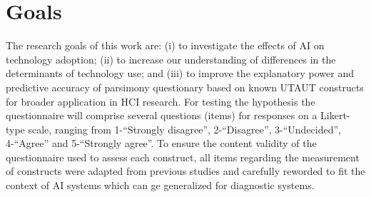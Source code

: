 
\section{Goals}
\label{sec:sec009}

The research goals of this work are: (i) to investigate the effects of AI on technology adoption; (ii) to increase our understanding of differences in the determinants of technology use; and (iii) to improve the explanatory power and predictive accuracy of parsimony questionary based on known UTAUT constructs for broader application in HCI research.
For testing the hypothesis the questionnaire will comprise several questions (items) for responses on a Likert-type scale, ranging from 1-``Strongly disagree'', 2-``Disagree'', 3-``Undecided'', 4-``Agree'' and 5-``Strongly agree''. To ensure the content validity of the questionnaire used to assess each construct, all items regarding the measurement of constructs were adapted from previous studies and carefully reworded to fit the context of AI systems which can ge generalized for diagnostic systems.

